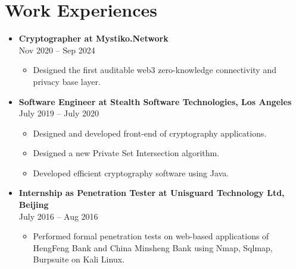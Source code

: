 \documentclass[a4paper,12pt]{article}
\begin{document}
\section*{Work Experiences}
\begin{itemize}[left=0pt, label={}, parsep=0pt]
    \item \textbf{Cryptographer at Mystiko.Network} \\
    Nov 2020 – Sep 2024
    \begin{itemize}[left=0pt,label=\textbullet,topsep=0pt]
        \item Designed the first auditable web3 zero-knowledge connectivity and privacy base layer.
    \end{itemize}
    \item \textbf{Software Engineer at Stealth Software Technologies, Los Angeles} \\
    July 2019 – July 2020 
    \begin{itemize}[left=0pt,label=\textbullet,topsep=0pt]
        \item Designed and developed front-end of cryptography applications. 
        \item Designed a new Private Set Intersection algorithm. 
        \item Developed efficient cryptography software using Java.
    \end{itemize}
    \item \textbf{Internship as Penetration Tester at Unisguard Technology Ltd, Beijing} \\
    July 2016 – Aug 2016 
    \begin{itemize}[left=0pt,label=\textbullet,topsep=0pt]
        \item Performed formal penetration tests on web-based applications of HengFeng Bank and China Minsheng Bank using Nmap, Sqlmap, Burpsuite on Kali Linux.
    \end{itemize}
\end{itemize}
\end{document}
